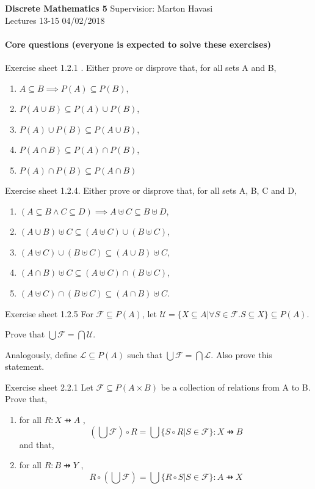 \documentclass{exam}
\begin{document}
\noindent
\large\textbf{Discrete Mathematics 5} \hfill Supervisior: Marton Havasi \\
\normalsize Lectures 13-15 \hfill 04/02/2018

\paragraph{Core questions (everyone is expected to solve these exercises)}
\begin{questions}

\question Exercise sheet 1.2.1 . Either prove or disprove that, for all sets A and B,
\begin{enumerate}[label=(\alph*)]
\item $A \subseteq B \implies P(A) \subseteq P(B)$,
\item $P(A \cup B) \subseteq P(A) \cup P(B)$,
\item $P(A) \cup P(B) \subseteq P(A \cup B)$,
\item $P(A \cap B) \subseteq P(A) \cap P(B)$,
\item $P(A) \cap P(B) \subseteq P(A \cap B)$
\end{enumerate} 

\question Exercise sheet 1.2.4. Either prove or disprove that, for all sets A, B, C and D,
\begin{enumerate}[label=(\alph*)]
\item $(A \subseteq B \wedge C \subseteq D) \implies A \uplus C \subseteq B \uplus D$,
\item $(A \cup B) \uplus C \subseteq (A \uplus C) \cup (B \uplus C)$,
\item $(A \uplus C) \cup (B \uplus C) \subseteq (A \cup B) \uplus C$,
\item $(A \cap B) \uplus C \subseteq (A \uplus C) \cap (B \uplus C)$,
\item $(A \uplus C) \cap (B \uplus C) \subseteq (A \cap B) \uplus C$.
\end{enumerate}

\question Exercise sheet 1.2.5 For $\mathcal{F} \subseteq P(A)$, let 
$\mathcal{U}=\{X \subseteq A | \forall S \in \mathcal{F}. S \subseteq X\} \subseteq P(A)$.

 Prove that $\bigcup \mathcal{F} = \bigcap \mathcal{U}$.
 
Analogously, define $\mathcal{L} \subseteq P(A)$ such that $\bigcup \mathcal{F} = \bigcap \mathcal{L}$. Also prove this statement.

\question Exercise sheet 2.2.1 Let $\mathcal{F} \subseteq P(A \times B)$ be a collection of relations from A to B. Prove that,
\begin{enumerate}[label=(\alph*)]
\item for all $R : X \pfun A$ ,
$$(\bigcup \mathcal{F}) \circ R = \bigcup \{S \circ R | S \in \mathcal{ F} \} : X \pfun B	$$
and that,
\item for all $R : B \pfun Y$ ,
$$R \circ (\bigcup \mathcal{F}) = \bigcup \{R \circ S | S \in \mathcal{ F} \} : A \pfun X	$$
\end{enumerate}


\end{questions}
\end{document}
